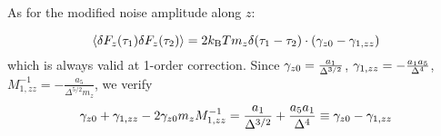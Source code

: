 \documentclass[fleqn,10pt]{InternshipReport_SI-ENS-PSL}
\begin{document}




As for the modified noise amplitude along $z$:

$$ \left\langle \delta F_z(\tau_1) \delta F_z(\tau_2) \right\rangle = 2 k_{\mathrm{B}} T m_z \delta(\tau_1 - \tau_2) \cdot \left( \gamma_{z0} - \gamma_{1,zz} \right) $$
which is always valid at 1-order correction. Since $\gamma_{z0} = \frac{a_1}{\Delta^{3/2}}$, $\gamma_{1,zz} = - \frac{a_1 a_5}{\Delta^4}$, $M^{-1}_{1,zz} = - \frac{a_5}{\Delta^{5/2} m_z}$, we verify
$$ \gamma_{z0} + \gamma_{1,zz} - 2\gamma_{z0} m_z M^{-1}_{1,zz} = \frac{a_1}{\Delta ^{3/2}}+\frac{a_5 a_1}{\Delta ^4} \equiv \gamma _{z0}-\gamma _{1,zz} $$
\end{document}
